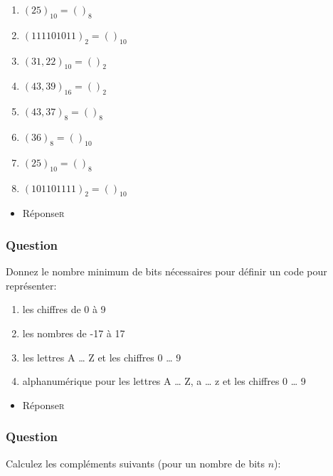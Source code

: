\documentclass[11pt]{article}
\begin{document}
\begin{enumerate}
\item \((25)_{10} = ( )_{8}\)

\item \((111101011)_{2} = ( )_{10}\)

\item \((31,22)_{10} = ( )_{2}\)

\item \((43,39)_{16} = ( )_{2}\)

\item \((43,37)_{8} = ( )_{8}\)

\item \((36)_{8} = ( )_{10}\)

\item \((25)_{10} = ( )_{8}\)

\item \((101101111)_{2} = ( )_{10}\)
\end{enumerate}

\begin{itemize}
\item Réponse\hfill{}\textsc{r}
\label{sec:org0806a7a}
\end{itemize}

\subsubsection*{Question}
\label{sec:orgc50bfac}
Donnez le nombre minimum de bits nécessaires pour définir un code
   pour représenter:

\begin{enumerate}
\item les chiffres de 0 à 9

\item les nombres de -17 à 17

\item les lettres A \dots{} Z et les chiffres 0 \dots{} 9

\item alphanumérique pour les lettres A \dots{} Z, a \dots{} z et les
chiffres 0 \dots{} 9
\end{enumerate}

\begin{itemize}
\item Réponse\hfill{}\textsc{r}
\label{sec:org9151792}
\end{itemize}

\subsubsection*{Question}
\label{sec:org7ee463b}
Calculez les compléments suivants (pour un nombre de bits \(n\)):
\end{document}

